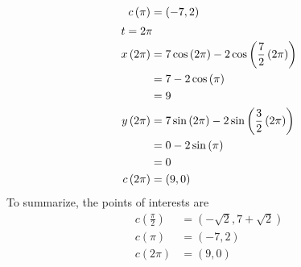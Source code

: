 \documentclass[12pt]{article}
\begin{document}
\begin{align}
  c\left(\pi\right)           & =\left(-7,2\right)                                                                       \\
  \intertext{$t=2\pi$}
  x\left(2\pi\right)          & =7\cos\left(2\pi\right)-2\cos\left(\frac{7}{2}\left(2\pi\right)\right)                   \\
                              & =7-2\cos\left(\pi\right)                                                                 \\
                              & =9                                                                                       \\
  y\left(2\pi\right)          & =7\sin\left(2\pi\right)-2\sin\left(\frac{3}{2}\left(2\pi\right)\right)                   \\
                              & =0-2\sin\left(\pi\right)                                                                 \\
                              & =0                                                                                       \\
  c\left(2\pi\right)          & =\left(9,0\right)                                                                        \\
\end{align}
To summarize, the points of interests are
\begin{align*}
  c\left(\frac{\pi}{2}\right) & = \left(-\sqrt{2},7+\sqrt{2}\right) \\
  c\left(\pi\right)           & = \left(-7,2\right)                 \\
  c\left(2\pi\right)          & = \left(9, 0\right)
\end{align*}
\end{document}
